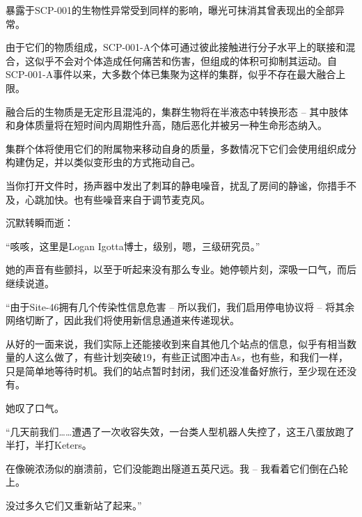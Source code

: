 暴露于SCP-001的生物性异常受到同样的影响，曝光可抹消其曾表现出的全部异常。

由于它们的物质组成，SCP-001-A个体可通过彼此接触进行分子水平上的联接和混合，这似乎不会对个体造成任何痛苦和伤害，但组成的体积可抑制其运动。自SCP-001-A事件以来，大多数个体已集聚为这样的集群，似乎不存在最大融合上限。

融合后的生物质是无定形且混沌的，集群生物将在半液态中转换形态 – 其中肢体和身体质量将在短时间内周期性升高，随后恶化并被另一种生命形态纳入。

集群个体将使用它们的附属物来移动自身的质量，多数情况下它们会使用组织成分构建伪足，并以类似变形虫的方式拖动自己。


\begin{scpbox}

当你打开文件时，扬声器中发出了刺耳的静电噪音，扰乱了房间的静谧，你措手不及，心跳加快。也有些噪音来自于调节麦克风。

沉默转瞬而逝：

\end{scpbox}

\begin{scpdialog}
“咳咳，这里是Logan Igotta博士，级别，嗯，三级研究员。”
\end{scpdialog}

\begin{scpbox}
她的声音有些颤抖，以至于听起来没有那么专业。她停顿片刻，深吸一口气，而后继续说道。
\end{scpbox}

\begin{scpdialog}
“由于Site-46拥有几个传染性信息危害 – 所以我们，我们启用停电协议将 – 将其余网络切断了，因此我们将使用新信息通道来传递现状。

从好的一面来说，我们实际上还能接收到来自其他几个站点的信息，似乎有相当数量的人这么做了，有些计划突破19，有些正试图冲击As，也有些，和我们一样，只是简单地等待时机。我们的站点暂时封闭，我们还没准备好旅行，至少现在还没有。
\end{scpdialog}

\begin{scpbox}
她叹了口气。
\end{scpbox}

\begin{scpdialog}

“几天前我们……遭遇了一次收容失效，一台类人型机器人失控了，这王八蛋放跑了半打，半打Keters。

在像碗浓汤似的崩溃前，它们没能跑出隧道五英尺远。我 – 我看着它们倒在凸轮上。

没过多久它们又重新站了起来。”

\end{scpdialog}

